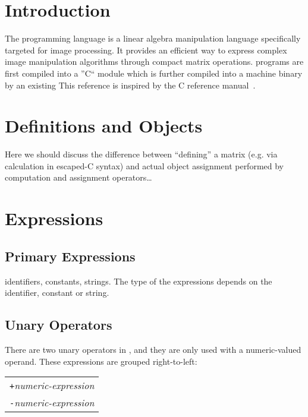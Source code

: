 \newcommand{\startsyn}{\begin{center}\begin{tabular}{l}}
\newcommand{\stopsyn}{\end{tabular}\end{center}}

\section{Introduction}
The \sys{} programming language is a linear algebra manipulation language
specifically targeted for image processing. It provides an efficient way to
express complex image manipulation algorithms through compact matrix
operations. \sys{} programs are first compiled into a ''C`` module which is
further compiled into a machine binary by an existing 
This reference is inspired by the C reference manual~\cite{DBLP:books/ph/KernighanR88}.




\section{Definitions and Objects}
\label{sec:defobj}
Here we should discuss the difference between ``defining'' a matrix (e.g. via calculation in escaped-C syntax) and actual object assignment performed by computation and assignment operators\ldots

\section{Expressions}
\label{sec:expressions}

\subsection{Primary Expressions}
\label{ssec:primaryexpresions}
identifiers, constants, strings. The type of the expressions depends on the identifier, constant or string.

\subsection{Unary Operators}
\label{ssec:unaryoperators}
There are two unary operators in \sys{}, and they are only used with a
numeric-valued operand.
These expressions are grouped right-to-left:
\startsyn
\texttt{+}\emph{numeric-expression} \\
\texttt{-}\emph{numeric-expression}
\stopsyn

